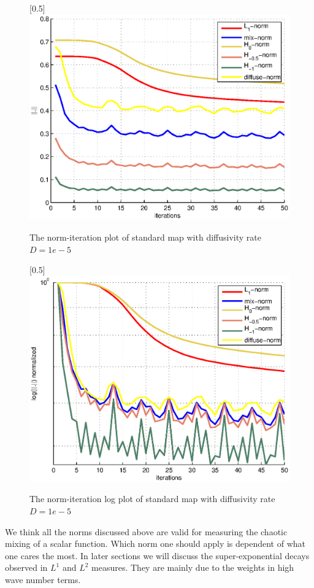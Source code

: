 \documentclass{article}
\begin{document}
\begin{figure}
\caption{\label{normplot} The norm-iteration plot of standard map with diffusivity rate $D = 1e-5$}
\centerline{\scalebox{0.5}[0.5]{\includegraphics{normplot.eps} }}
\end{figure}
\begin{figure}
\caption{\label{lognormplot} The norm-iteration log plot of standard map with diffusivity rate $D = 1e-5$}
\centerline{\scalebox{0.5}[0.5]{\includegraphics{lognormplot.eps} }}
\end{figure}



We think all the norms discussed above are valid for measuring the chaotic mixing of a scalar function. Which norm one should apply is dependent of what one cares the most. In later sections we will discuss the super-exponential decays observed in $L^1$ and $L^2$ measures. They are mainly due to the weights in high wave number terms. 
\end{document}
